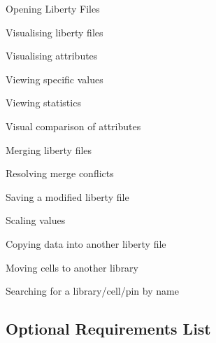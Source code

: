 \documentclass[10pt,a4paper]{report}
\begin{document}
\begin{FR}
    \item Opening Liberty Files \label{FR-1}
    \item Visualising liberty files \label{FR-2}
    \item Visualising attributes \label{FR-3}
    \item Viewing specific values \label{FR-4}
    \item Viewing statistics \label{FR-5}
    \item Visual comparison of attributes \label{FR-6}
    \item Merging liberty files \label{FR-7}
    \item Resolving merge conflicts \label{FR-8}
    \item Saving a modified liberty file \label{FR-9}
    \item Scaling values \label{FR-10}
    \item Copying data into another liberty file \label{FR-11}
    \item Moving cells to another library \label{FR-12}
    \item Searching for a library/cell/pin by name \label{FR-13}
\end{FR}
\subsection{Optional Requirements List}
\end{document}
